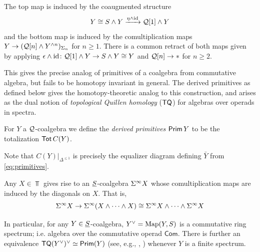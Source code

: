 The top map is induced by the coaugmented structure \[Y\cong S\wedge Y\xrightarrow{\eta\wedge \mathrm{id}} \mathcal{Q}[1]\wedge Y\]
and the bottom map is induced by the comultiplication maps $Y\to (\mathcal{Q}[n]\wedge Y^{\wedge n})_{\Sigma_n}$ for $n\geq 1$. There is a common retract of both maps given by applying $\epsilon\wedge \mathrm{id}\colon \mathcal{Q}[1]\wedge Y\to S\wedge Y\cong Y$ and $\mathcal{Q}[n]\to *$ for $n\geq 2$. 

This gives the precise analog of primitives of a coalgebra from commutative algebra, but fails to be homotopy invariant in general. The derived primitives as defined below gives the homotopy-theoretic analog to this construction, and arises as the dual notion of \textit{topological Quillen homology} ($\mathsf{TQ}$) for algebras over operads in spectra. 

\begin{definition} \label{def:derived-prim} For $Y$ a $\mathcal{Q}$-coalgebra we define the \textit{derived primitives} $\operatorname{\mathsf{Prim}} Y$ to be the totalization $\operatorname{\mathsf{Tot}} C(Y)$. 
\end{definition}

Note that $C(Y)|_{\Delta^{\leq 1}}$ is precisely the equalizer diagram defining $\bar{Y}$ from \eqref{eq:primitives}.

\begin{example} \label{rem:SW-TQ}
    Any $X\in \Top$ gives rise to an $\underline{S}$-coalgebra $\Sigma^{\infty} X$ whose comultiplication maps are induced by the diagonals on $X$. That is, \[\Sigma^{\infty} X\to \Sigma^{\infty} (X\wedge \cdots \wedge X)\cong \Sigma^{\infty} X\wedge \cdots \wedge \Sigma^{\infty} X\]

    In particular, for any $Y\in \underline{S}$-coalgebra, $Y^{\vee}=\operatorname{Map}(Y,S)$ is a commutative ring spectrum; i.e. algebra over the commutative operad $\mathsf{Com}$. There is further an equivalence  $\mathsf{TQ}(Y^{\vee})^{\vee}\simeq \operatorname{\mathsf{Prim}} (Y)$ (see, e.g., \cite{BR}, \cite{Heuts-vn}) whenever $Y$ is a finite spectrum.
    \end{example}